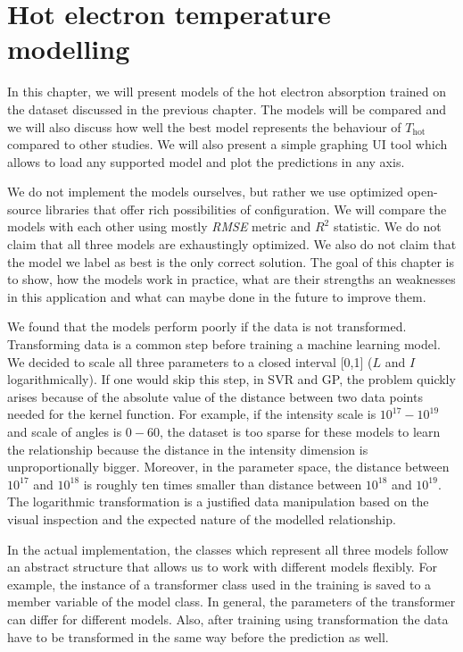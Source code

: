\chapter{Hot electron temperature modelling}
In this chapter, we will present models of the hot electron absorption trained on the dataset discussed in the previous chapter. The models will be compared and we will also discuss how well the best model represents the behaviour of $T_{\mathrm{hot}}$ compared to other studies. We will also present a simple graphing UI tool which allows to load any supported model and plot the predictions in any axis.

We do not implement the models ourselves, but rather we use optimized open-source libraries that offer rich possibilities of configuration. We will compare the models with each other using mostly \textit{RMSE} metric and $R^2$ statistic. We do not claim that all three models are exhaustingly optimized. We also do not claim that the model we label as best is the only correct solution. The goal of this chapter is to show, how the models work in practice, what are their strengths an weaknesses in this application and what can maybe done in the future to improve them.

We found that the models perform poorly if the data is not transformed. Transforming data is a common step before training a machine learning model. We decided to scale all three parameters to a closed interval [0,1] ($L$ and $I$ logarithmically). If one would skip this step, in SVR and GP, the problem quickly arises because of the absolute value of the distance between two data points needed for the kernel function. For example, if the intensity scale is $10^{17} - 10^{19}$ and scale of angles is $0-60$, the dataset is too sparse for these models to learn the relationship because the distance in the intensity dimension is unproportionally bigger. Moreover, in the parameter space, the distance between $10^{17}$ and $10^{18}$ is roughly ten times smaller than distance between $10^{18}$ and $10^{19}$. The logarithmic transformation is a justified data manipulation based on the visual inspection and the expected nature of the modelled relationship.

In the actual implementation, the classes which represent all three models follow an abstract structure that allows us to work with different models flexibly. For example, the instance of a transformer class used in the training is saved to a member variable of the model class. In general, the parameters of the transformer can differ for different models. Also, after training using transformation the data have to be transformed in the same way before the prediction as well.

